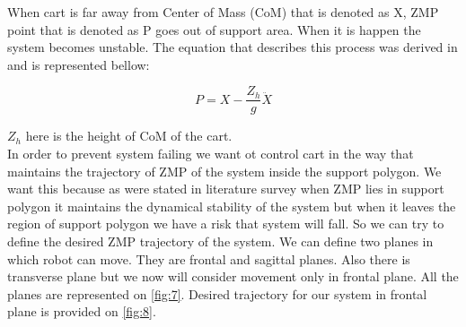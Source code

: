 \documentclass[12pt,a4paper]{report}
\begin{document}
		When cart is far away from Center of Mass (CoM) that is denoted as X, ZMP point that is denoted as P goes out of support area. When it is happen the system becomes unstable.
		The equation that describes this process was derived in \cite{kajita2003biped} and is represented bellow:
		
		\begin{equation}
			P = X -\dfrac{Z_h}{g} \ddot{X}
		\end{equation}
		
		$Z_h$ here is the height of CoM of the cart.\\
		In order to prevent system failing we want ot control cart in the way that maintains the trajectory of ZMP of the system inside the support polygon. We want this because as were stated in literature survey when ZMP lies in support polygon it maintains the dynamical stability of the system but when it leaves the region of support polygon we have a risk that system will fall. So we can try to define the desired ZMP trajectory of the system. We can define two planes in which robot can move. They are frontal and sagittal planes. Also there is transverse plane but we now will consider movement only in frontal plane. All the planes are represented on \cref{fig:7}. Desired trajectory for our system in frontal plane is provided on \ref{fig:8}.
		
\end{document}
